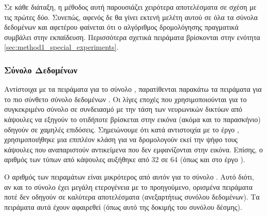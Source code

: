 Σε κάθε διάταξη, η μέθοδος αυτή παρουσιάζει χειρότερα αποτελέσματα σε σχέση με τις πρώτες δύο. Συνεπώς, αφενός δε θα γίνει εκτενή μελέτη αυτού σε όλα τα σύνολα δεδομένων και αφετέρου φαίνεται ότι ο αλγόριθμος δρομολόγησης πραγματικά συμβάλει στην εκπαίδευση. Περισσότερα σχετικά πειράματα βρίσκονται στην ενότητα \ref{sec:method1_special_experiments}.

\subsubsection{Σύνολο Δεδομένων }
Αντίστοιχα με τα πειράματα για το σύνολο , παρατίθενται παρακάτω τα πειράματα για το πιο σύνθετο σύνολο δεδομένων . Οι λίγες εποχές που χρησιμοποιούνται για το συγκεκριμένο σύνολο σε συνδειασμό με την τάση των νευρωνικών δικτύων από κάψουλες να εξηγούν το οτιδήποτε βρίσκεται στην εικόνα (ακόμα και το παρασκήνιο) οδηγούν σε χαμηλές επιδόσεις. Σημειώνουμε ότι κατά αντιστοιχία με το έργο \cite{sabour2017dynamic}, χρησιμοποιήθηκε μια επιπλέον κλάση  για να δρομολογούν εκεί την ψήφο τους κάψουλες που αναπαριστούν αντικείμενα που δεν εμφανίζονται στην εικόνα. Επίσης, ο αριθμός των τύπων από κάψουλες αυξήθηκε από 32 σε 64 (όπως και στο έργο \cite{sabour2017dynamic}).\par

Ο αριθμός των πειραμάτων είναι μικρότερος από αυτόν για το σύνολο . Αυτό διότι, αν και το σύνολο  έχει μεγάλη ετερογένεια με το προηγούμενο, ορισμένα πειράματα ποτέ δεν οδηγούν σε καλύτερα αποτελέσματα (ανεξαρτήτως συνόλου δεδομένων). Τα πειράματα αυτά έχουν αφαιρεθεί (όπως αυτό της δοκιμής του συνόλου δέσμης).

